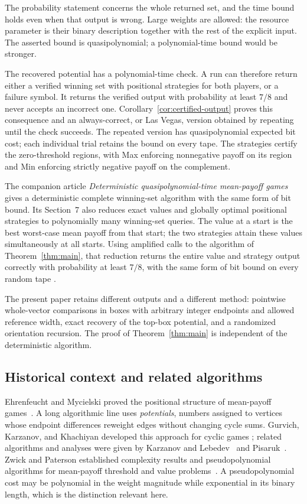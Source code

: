 The probability statement concerns the whole returned set, and the time
bound holds even when that output is wrong. Large weights are allowed:
the resource parameter is their binary description together with the
rest of the explicit input. The asserted bound is quasipolynomial;
a polynomial-time bound would be stronger.

The recovered potential has a polynomial-time check. A run can therefore
return either a verified winning set with positional strategies for both
players, or a failure symbol. It returns the verified output with
probability at least $7/8$ and never accepts an incorrect one.
Corollary~\ref{cor:certified-output} proves this consequence and an
always-correct, or Las Vegas, version obtained by repeating until the
check succeeds. The repeated version has quasipolynomial expected bit
cost; each individual trial retains the bound on every tape. The
strategies certify the zero-threshold regions, with Max enforcing
nonnegative payoff on its region and Min enforcing strictly negative
payoff on the complement.

The companion article \emph{Deterministic quasipolynomial-time
mean-payoff games}~\cite[Theorem~1.1]{OpenAI2026Deterministic} gives
a deterministic complete winning-set algorithm with the same form of
bit bound. Its Section~7 also reduces exact values and globally optimal
positional strategies to polynomially many winning-set queries. The
value at a start is the best worst-case mean payoff from that start;
the two strategies attain these values simultaneously at all starts.
Using amplified calls to the algorithm of Theorem~\ref{thm:main},
that reduction returns
the entire value and strategy output correctly with probability at
least $7/8$, with the same form of bit bound on every random tape
\cite[Section~7]{OpenAI2026Deterministic}.

The present paper retains different outputs and a different method:
pointwise whole-vector comparisons in boxes with arbitrary integer
endpoints and allowed reference width, exact recovery of the top-box
potential, and a randomized orientation recursion. The proof of
Theorem~\ref{thm:main} is independent of the deterministic algorithm.

\subsection{Historical context and related algorithms}

Ehrenfeucht and Mycielski proved the positional structure of mean-payoff
games~\cite{EhrenfeuchtMycielski1979}. A long algorithmic line uses
\emph{potentials}, numbers assigned to vertices whose endpoint
differences reweight edges without changing cycle sums. Gurvich,
Karzanov, and Khachiyan developed this approach for cyclic games
\cite{GurvichKarzanovKhachiyan1988}; related algorithms and analyses
were given by Karzanov and Lebedev~\cite{KarzanovLebedev1993} and
Pisaruk~\cite{Pisaruk1999}. Zwick and Paterson established complexity
results and pseudopolynomial algorithms for mean-payoff threshold and
value problems~\cite{ZwickPaterson1996}. A pseudopolynomial cost may be
polynomial in the weight magnitude while exponential in its binary
length, which is the distinction relevant here.

